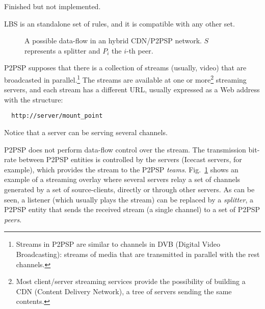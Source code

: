 

\label{sec:LBS}

\begin{notex}
  Finished but not implemented.
\end{notex}

LBS is an standalone set of rules, and it is compatible with any other
set.

\begin{figure}
  \caption{A possible data-flow in an hybrid CDN/P2PSP
    network. $S$ represents a splitter and $P_i$ the $i$-th
    peer.} %
  \label{fig:icecast-P2PSP}
\end{figure}

P2PSP supposes that there is a collection of \glspl{stream} (usually,
video) that are broadcasted in parallel.\footnote{Streams in P2PSP are
  similar to channels in DVB (Digital Video Broadcasting): streams of
  media that are transmitted in parallel with the rest channels.}  The
\glspl{stream} are available at one or more\footnote{Most
  client/server streaming services provide the possibility of building
  a CDN (Content Delivery Network), a tree of servers sending the same
  contents.} streaming \glspl{server}, and each stream has a different
\acrlong{URL}, usually expressed as a Web address with the structure:
\begin{verbatim}
  http://server/mount_point
\end{verbatim}
Notice that a server can be serving several channels.

P2PSP does not perform data-flow control over the stream. The
transmission bit-rate between P2PSP entities is controlled by the
servers (Icecast servers, for example), which provides the stream to
the P2PSP \emph{teams}. Fig.~\ref{fig:icecast-P2PSP} shows an example
of a streaming overlay where several servers relay a set of channels
generated by a set of source-clients, directly or through other
servers. As can be seen, a listener (which usually plays the stream)
can be replaced by a \emph{splitter}, a P2PSP entity that sends the
received stream (a single channel) to a set of P2PSP \emph{peers}.


